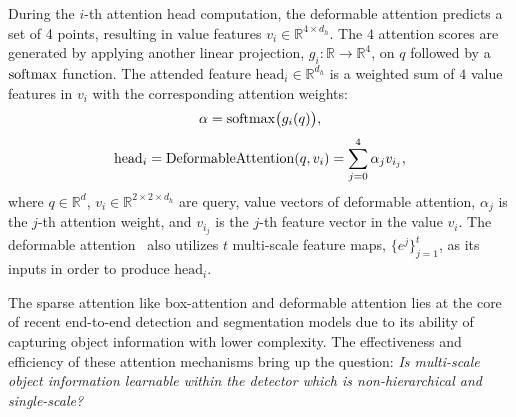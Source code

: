 During the $i$-th attention head computation, the deformable attention predicts a set of 4 points, resulting in value features $v_i \in \mathbb{R}^{4\times d_h}$. The $4$ attention scores are generated by applying another linear projection, $g_i: \mathbb{R} \rightarrow \mathbb{R}^4$, on $q$ followed by a $\mathrm{softmax}$ function. The attended feature $\mathrm{head}_i \in \mathbb{R}^{d_h}$ is a weighted sum of $4$ value features in $v_i$ with the corresponding attention weights:
%
\begin{equation}
    \alpha =  \mathrm{softmax}\big(g_i(q)\big),
\end{equation}
\begin{equation}
    \mathrm{head}_i = \mathop{\mathrm{DeformableAttention}}(q, v_i) = \sum_{j=0}^{4} \alpha_j v_{i_j},
\end{equation}
%
where $q \in \mathbb{R}^d$, $v_i \in \mathbb{R}^{2 \times 2 \times d_h}$ are query, value vectors of deformable attention, $\alpha_j$ is the $j$-th attention weight, and $v_{i_j}$ is the $j$-th feature vector in the value $v_i$. The deformable attention~\cite{zhu2021deformable} also utilizes $t$ multi-scale feature maps, $\{e^j\}_{j=1}^t$, as its inputs in order to produce $\mathrm{head}_i$.



The sparse attention like box-attention and deformable attention lies at the core of recent end-to-end detection and segmentation models due to its ability of capturing object information with lower complexity. The effectiveness and efficiency of these attention mechanisms bring up the question: \textit{Is multi-scale object information learnable within the detector which is non-hierarchical and single-scale?}
